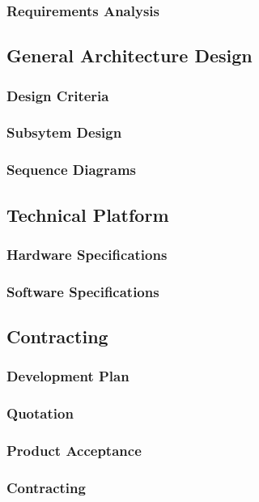 	\subsubsection{Requirements	 Analysis}
\subsection{General Architecture Design}
	\subsubsection{Design Criteria}
	\subsubsection{Subsytem Design}
	\subsubsection{Sequence Diagrams}
\subsection{Technical Platform}
	\subsubsection{Hardware Specifications}
	\subsubsection{Software Specifications}
\subsection{Contracting}
	\subsubsection{Development Plan}
	\subsubsection{Quotation}
	\subsubsection{Product Acceptance}
	\subsubsection{Contracting}

